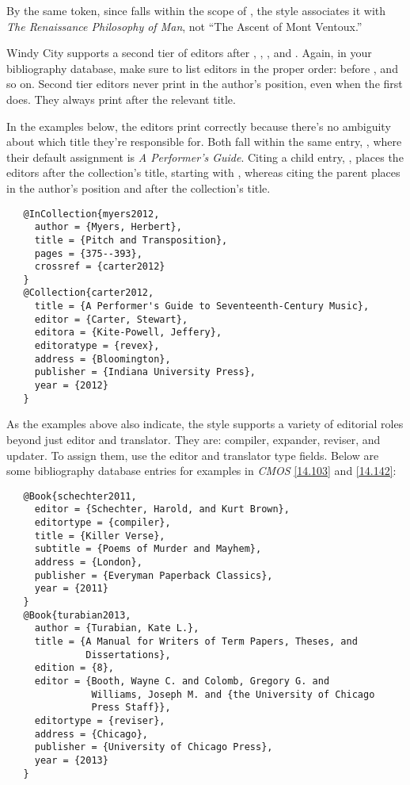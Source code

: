 \documentclass[11pt,letterpaper,oneside]{article}
\begin{document}
\noindent By the same token, since  falls within the
scope of , the style associates it with
\textit{The Renaissance Philosophy of Man}, not ``The Ascent of Mont
Ventoux.''

Windy City supports a second tier of editors after ,
, , and .
Again, in your bibliography database, make sure to list editors in the
proper order:  before , and so on.
Second tier editors never print in the author's position, even when
the first does. They always print after the relevant title.

In the examples below, the editors print correctly because there's no
ambiguity about which title they're responsible for. Both fall within
the same entry, , where their default assignment
is \textit{A Performer's Guide}. Citing a child entry,
, places the editors after the collection's title,
starting with , whereas citing the parent places
 in the author's position and 
after the collection's title.

\begin{verbatim}
   @InCollection{myers2012,
     author = {Myers, Herbert},
     title = {Pitch and Transposition},
     pages = {375--393},
     crossref = {carter2012}
   }
   @Collection{carter2012,
     title = {A Performer's Guide to Seventeenth-Century Music},
     editor = {Carter, Stewart},
     editora = {Kite-Powell, Jeffery},
     editoratype = {revex},
     address = {Bloomington},
     publisher = {Indiana University Press},
     year = {2012}
   }
\end{verbatim}

\begin{bibonly}
\nocite{myers2012,carter2012}
\end{bibonly}

As the examples above also indicate, the style supports a variety of
editorial roles beyond just editor and translator. They are: compiler,
expander, reviser, and updater. To assign them, use the editor and
translator type fields. Below are some bibliography database entries
for examples in \textit{CMOS} \ref{14.103} and \ref{14.142}:

\begin{verbatim}
   @Book{schechter2011,
     editor = {Schechter, Harold, and Kurt Brown},
     editortype = {compiler},
     title = {Killer Verse},
     subtitle = {Poems of Murder and Mayhem},
     address = {London},
     publisher = {Everyman Paperback Classics},
     year = {2011}
   }
   @Book{turabian2013,
     author = {Turabian, Kate L.},
     title = {A Manual for Writers of Term Papers, Theses, and
              Dissertations},
     edition = {8},
     editor = {Booth, Wayne C. and Colomb, Gregory G. and
               Williams, Joseph M. and {the University of Chicago
               Press Staff}},
     editortype = {reviser},
     address = {Chicago},
     publisher = {University of Chicago Press},
     year = {2013}
   }
\end{verbatim}
\end{document}

